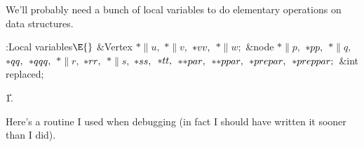 We'll probably need a bunch of local variables to do
elementary operations on
data structures.

\Y\B\4:Local variables\X${}\E{}$\6
\&{Vertex} ${}{*}\|u,{}$ ${}{*}\|v,{}$ ${}{*}\\{vv},{}$ ${}{*}\|w;{}$\6
\&{node} ${}{*}\|p,{}$ ${}{*}\\{pp},{}$ ${}{*}\|q,{}$ ${}{*}\\{qq},{}$ ${}{*}%
\\{qqq},{}$ ${}{*}\|r,{}$ ${}{*}\\{rr},{}$ ${}{*}\|s,{}$ ${}{*}\\{ss},{}$
${}{*}\\{tt},{}$ ${}{*}{*}\\{par},{}$ ${}{*}{*}\\{ppar},{}$ ${}{*}%
\\{prepar},{}$ ${}{*}\\{preppar};{}$\6
\&{int} \\{replaced};\par
\U1.\fi

Here's a routine I used when debugging (in fact I should
have written
it sooner than I did).

